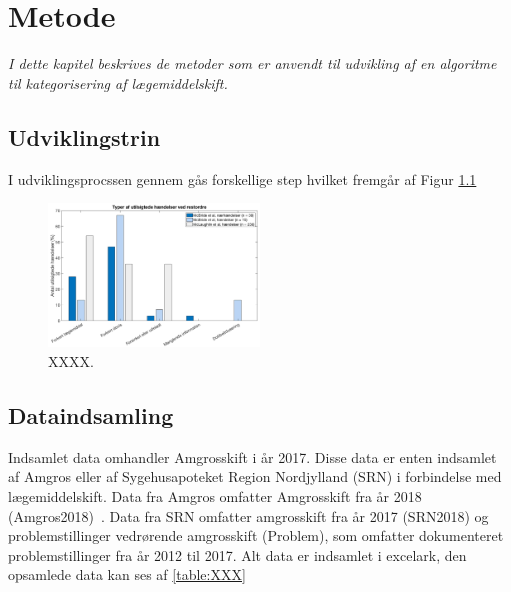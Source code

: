 \chapter{Metode}
\textit{I dette kapitel beskrives de metoder som er anvendt til udvikling af en algoritme til kategorisering af  lægemiddelskift.}

\section{Udviklingstrin}
I udviklingsprocssen gennem gås forskellige step hvilket fremgår af Figur \ref{fig:XXX}

\begin{figure}[H]\centering	\includegraphics[width=0.5\textwidth]{billeder/UTH2.png} 
	\caption{XXXX.}
	\label{fig:XXX}  
\end{figure}

\section{Dataindsamling}
Indsamlet data omhandler Amgrosskift i år 2017. Disse data er enten indsamlet af Amgros eller af Sygehusapoteket Region Nordjylland (SRN) i forbindelse med lægemiddelskift. Data fra Amgros omfatter Amgrosskift fra år 2018 (Amgros2018)~. Data fra SRN omfatter amgrosskift fra år 2017 (SRN2018) og problemstillinger vedrørende amgrosskift (Problem), som omfatter dokumenteret problemstillinger fra år 2012 til 2017. Alt data er indsamlet i excelark, den opsamlede data kan ses af \ref{table:XXX}

